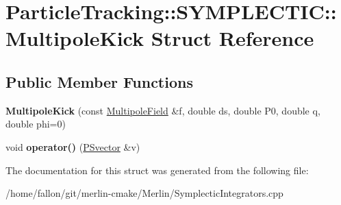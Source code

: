 \hypertarget{structParticleTracking_1_1SYMPLECTIC_1_1MultipoleKick}{}\section{Particle\+Tracking\+:\+:S\+Y\+M\+P\+L\+E\+C\+T\+IC\+:\+:Multipole\+Kick Struct Reference}
\label{structParticleTracking_1_1SYMPLECTIC_1_1MultipoleKick}
\subsection*{Public Member Functions}
\begin{DoxyCompactItemize}
\item 
\mbox{\label{structParticleTracking_1_1SYMPLECTIC_1_1MultipoleKick_a8ba34a40c2468a6725d2cf5011a38cb5}} 
{\bfseries Multipole\+Kick} (const \hyperlink{classMultipoleField}{Multipole\+Field} \&f, double ds, double P0, double q, double phi=0)
\item 
\mbox{\label{structParticleTracking_1_1SYMPLECTIC_1_1MultipoleKick_ac38ece0389796db7912a53963d4250ab}} 
void {\bfseries operator()} (\hyperlink{classPSvector}{P\+Svector} \&v)
\end{DoxyCompactItemize}


The documentation for this struct was generated from the following file\+:\begin{DoxyCompactItemize}
\item 
/home/fallon/git/merlin-\/cmake/\+Merlin/Symplectic\+Integrators.\+cpp\end{DoxyCompactItemize}
